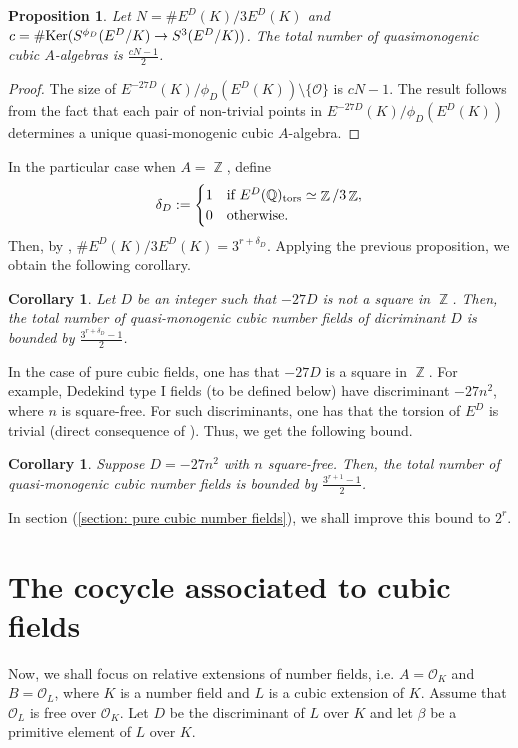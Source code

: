 \documentclass[oneside]{amsart}
\renewcommand{\ker}{\textnormal{Ker}}
\DeclareMathOperator{\QQ}{\mathbb{Q}}
\DeclareMathOperator{\ZZ}{\mathbb{Z}}
\DeclareMathOperator{\tors}{tors}
\newtheorem{corollary}[X]{Corollary}
\newtheorem{proposition}[X]{Proposition}
\theoremstyle{definition}
\begin{document}
\begin{proposition}
    Let $N = \# E^D(K)/3E^D(K)$ and $c = \#\ker(S^{\phi_D}(E^D/K) \to S^3(E^D/K))$. The total number of quasimonogenic cubic $A$-algebras is $\frac{cN - 1}{2}$.
\end{proposition}
\begin{proof}
    The size of $E^{-27D}(K)/\phi_D(E^D(K)) \setminus\{\mathcal{O}\}$ is $cN - 1$. The result follows from the fact that each pair of non-trivial points in $E^{-27D}(K)/\phi_D(E^D(K))$ determines a unique quasi-monogenic cubic $A$-algebra.
\end{proof}
In the particular case when $A = \ZZ$, define 
$$
\delta_D :=
\begin{cases}
    1&\textnormal{if }E^D(\QQ)_{\tors}\simeq \ZZ/3\ZZ, \\
    0&\textnormal{otherwise.}
\end{cases}
$$
Then, by \cite[Thm. 5.3]{knapp}, $\# E^D(K)/3E^D(K) = 3^{r + \delta_D}$. Applying the previous proposition, we obtain the following corollary.
\begin{corollary}
    Let $D$ be an integer such that $-27D$ is not a square in $\ZZ$. Then, the total number of quasi-monogenic cubic number fields of dicriminant $D$ is bounded by $\frac{3^{r + \delta_D} - 1}{2}$. 
\end{corollary}
In the case of pure cubic fields, one has that $-27D$ is a square in $\ZZ$. For example, Dedekind type I fields (to be defined below) have discriminant $-27n^2$, where $n$ is square-free. For such discriminants, one has that the torsion of $E^D$ is trivial (direct consequence of \cite[Thm. 5.3]{knapp}). Thus, we get the following bound. 
\begin{corollary}
    Suppose $D = -27n^2$ with $n$ square-free. Then, the total number of quasi-monogenic cubic number fields is bounded by $\frac{3^{r + 1}-1}{2}$.
\end{corollary}

In section (\ref{section: pure cubic number fields}), we shall improve this bound to $2^r$.

\section{The cocycle associated to cubic fields}
\label{section: cocycle associated to cubic fields}
Now, we shall focus on relative extensions of number fields, i.e. $A = \mathcal{O}_K$ and $B = \mathcal{O}_L$, where $K$ is a number field and $L$ is a cubic extension of $K$. Assume that $\mathcal{O}_L$ is free over $\mathcal{O}_K$. Let $D$ be the discriminant of $L$ over $K$ and let $\beta$ be a primitive element of $L$ over $K$.
\end{document}
